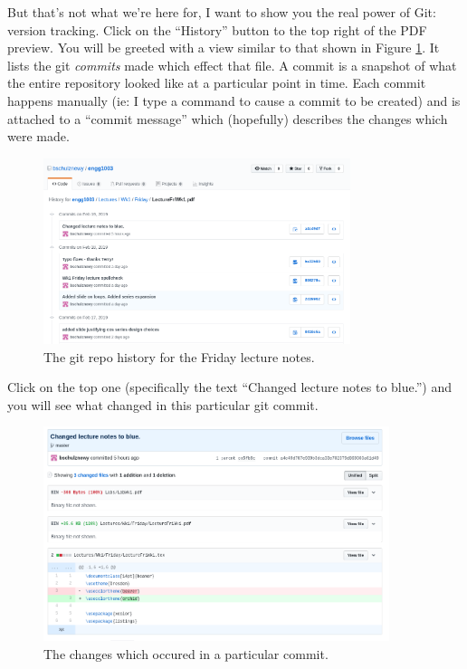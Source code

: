 \documentclass{lab}
\begin{document}
But that's not what we're here for, I want to show you the real power of Git: version tracking. Click on the ``History'' button to the top right of the PDF preview. You will be greeted with a view similar to that shown in Figure \ref{fig:githistory}. It lists the git \textit{commits} made which effect that file. A commit is a snapshot of what the entire repository looked like at a particular point in time. Each commit happens manually (ie: I type a command to cause a commit to be created) and is attached to a ``commit message'' which (hopefully) describes the changes which were made.

\begin{figure}[H]
\begin{center}
\includegraphics[width=0.8\textwidth]{github_lecture.png}
\end{center}
\caption{The git repo history for the Friday lecture notes.}\label{fig:githistory}
\end{figure}

Click on the top one (specifically the text ``Changed lecture notes to blue.'') and you will see what changed in this particular git commit.

\begin{figure}[H]
\begin{center}
\includegraphics[width=0.9\textwidth]{github_lecture_changes.png}
\end{center}
\caption{The changes which occured in a particular commit.}\label{fig:gitchanges}
\end{figure}
\end{document}
